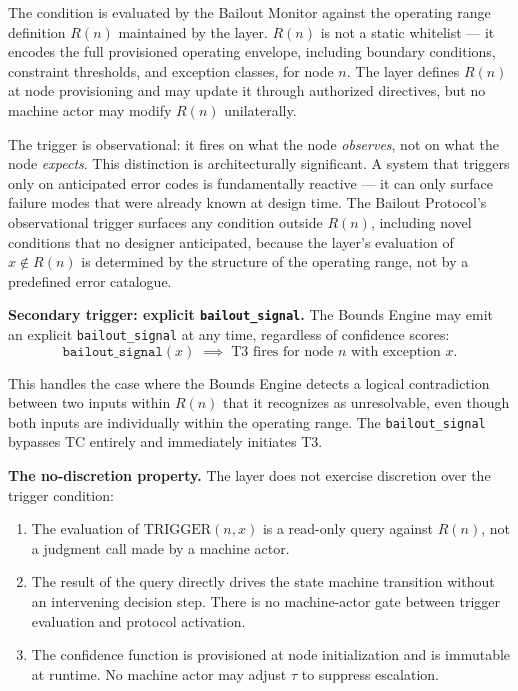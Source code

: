 The condition is evaluated by the Bailout Monitor against the operating range definition $R(n)$ maintained by the \purpose{} layer. $R(n)$ is not a static whitelist --- it encodes the full provisioned operating envelope, including boundary conditions, constraint thresholds, and exception classes, for node $n$. The \purpose{} layer defines $R(n)$ at node provisioning and may update it through authorized directives, but no machine actor may modify $R(n)$ unilaterally.

The trigger is observational: it fires on what the node \emph{observes}, not on what the node \emph{expects}. This distinction is architecturally significant. A system that triggers only on anticipated error codes is fundamentally reactive --- it can only surface failure modes that were already known at design time. The Bailout Protocol's observational trigger surfaces any condition outside $R(n)$, including novel conditions that no designer anticipated, because the \bounds{} layer's evaluation of $x \notin R(n)$ is determined by the structure of the operating range, not by a predefined error catalogue.

\bigskip
\noindent\textbf{Secondary trigger: explicit \texttt{bailout\_signal}.} The Bounds Engine may emit an explicit \texttt{bailout\_signal} at any time, regardless of confidence scores:
\begin{equation}
\texttt{bailout\_signal}(x) \;\implies\; \text{T3 fires for node } n \text{ with exception } x. \tag{TC-secondary}
\end{equation}

This handles the case where the Bounds Engine detects a logical contradiction between two inputs within $R(n)$ that it recognizes as unresolvable, even though both inputs are individually within the operating range. The \texttt{bailout\_signal} bypasses TC entirely and immediately initiates T3.

\bigskip
\noindent\textbf{The no-discretion property.} The \bounds{} layer does not exercise discretion over the trigger condition:
\begin{enumerate}
    \item The evaluation of $\text{TRIGGER}(n, x)$ is a read-only query against $R(n)$, not a judgment call made by a machine actor.
    \item The result of the query directly drives the state machine transition without an intervening decision step. There is no machine-actor gate between trigger evaluation and protocol activation.
    \item The confidence function is provisioned at node initialization and is immutable at runtime. No machine actor may adjust $\tau$ to suppress escalation.
\end{enumerate}

